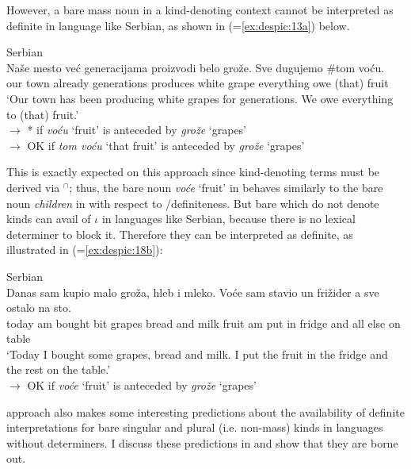 \documentclass[output=paper,
modfonts
]{langscibook}
\begin{document}
	However, a bare mass noun in a kind-denoting context cannot be interpreted as definite in
	language like Serbian, as shown in  (=\ref{ex:despic:13a}) below. 
	
	\ea \label{ex:despic:33}
	Serbian \\
	\gll 
	{Na\v se} {mesto} {ve\'c} {generacijama} {proizvodi} {belo} {gro\v z\dj e}. {Sve} {dugujemo} {\textnormal{\#}{\op}tom{\cp}} {vo\'cu}. \\
	our town already generations produces white grape everything owe \phantom{\#}(that) fruit \\ 
	\glt `Our town has been producing white grapes for generations. We owe everything to (that) fruit.' \\
	$\rightarrow$ * if \textit{vo\'cu} `fruit' is anteceded by \textit{gro\v z\dj e} `grapes' \\\largerpage
	$\rightarrow$ OK if \textit{tom vo\'cu} `that fruit' is anteceded by \textit{gro\v z\dj e} `grapes' 
	\z 
	
	This is exactly expected on this approach since kind-denoting terms must be derived via $^\cap$; thus, the bare noun \textit{vo\'ce} `fruit' in  behaves similarly to the bare noun \textit{children} in  with respect to /definiteness. But bare  which do not denote kinds can avail of $\iota$ in languages like Serbian, because there is no lexical determiner to block it. Therefore they can be interpreted as definite, as illustrated in  (=\ref{ex:despic:18b}):
	
	\ea \label{ex:despic:34}
	Serbian \\
	\gll 
	{Danas} {sam} {kupio} {malo} {gro\v z\dj a}, {hleb} {i} {mleko}. {Vo\'ce} {sam} {stavio} {un} {fri\v zider} {a} {sve} {ostalo} {na} {sto}. \\
	today am bought bit grapes bread and milk fruit am put in fridge and all else on table \\ 
	\glt `Today I bought some grapes, bread and milk. I put the fruit in the fridge and the rest on the table.' \\
	$\rightarrow$ OK if \textit{vo\'ce} `fruit' is anteceded by \textit{gro\v z\dj e} `grapes' 
	\z 
	
	 approach also makes some interesting predictions about the availability of definite interpretations for bare singular and plural (i.e. non-mass) kinds in languages without determiners. I discuss these predictions in  and show that they are borne out.
	
\end{document}
